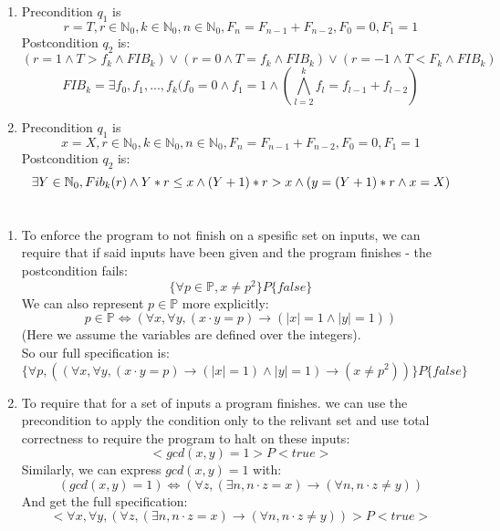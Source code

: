 \documentclass{article}
\begin{document}
\section{}
\begin{enumerate}[label=\Alph*.]
    \item Precondition $q_1$ is $$r=T, r \in \mathbb{N}_0, k \in \mathbb{N}_0, n \in \mathbb{N}_0, F_n = F_{n-1}+F_{n-2}, F_0 = 0, F_1 = 1$$
    Postcondition $q_2$ is: $$(r=1 \wedge T>f_k \wedge FIB_k) \vee (r=0 \wedge T=f_k \wedge FIB_k) \vee (r=-1 \wedge T<F_k \wedge FIB_k)$$
    $$FIB_k = \exists f_0, f_1,...,f_k(f_0=0 \wedge f_1=1 \wedge ( \bigwedge\limits_{l=2}^k f_l=f_{l-1} + f_{l-2} ) $$
    \item Precondition $q_1$ is $$x=X, r \in \mathbb{N}_0, k \in \mathbb{N}_0, n \in \mathbb{N}_0, F_n = F_{n-1}+F_{n-2}, F_0 = 0, F_1 = 1$$
    Postcondition $q_2$ is:
    $$ \exists Y \in \mathbb{N}_0, Fib_k(r) \wedge \\
    Y*r\leq x \wedge (Y+1)*r > x \wedge \\
    (y=(Y+1)*r \wedge x=X)$$
\end{enumerate}

\section{}
\begin{enumerate}[label=\Alph*.]
    \item To enforce the program to not finish
    on a spesific set on inputs, we can require that if
    said inputs have been given and the program finishes - 
    the postcondition fails:
    \[\{\forall p\in\mathbb{P}, x\neq p^2\}P\{false\}\]
    We can also represent $p\in\mathbb{P}$ more explicitly:
    \[p\in\mathbb{P}\Leftrightarrow
    (\forall x,\forall y, (x\cdot y=p)\rightarrow (|x|=1\wedge|y|=1))\]
    (Here we assume the variables are defined over the integers).\\
    So our full specification is:
    \[\{\forall p,
    ((\forall x,\forall y, (x\cdot y=p)\rightarrow (|x|=1)\wedge|y|=1)
    \rightarrow
    (x\neq p^2))\}P\{false\}\]
    \item To require that for a set of inputs a program finishes.
    we can use the precondition to apply the condition only to
    the relivant set and use total correctness to require the program to halt
    on these inputs:
    \[<gcd(x,y)=1>P<true>\]
    Similarly, we can express $gcd(x,y)=1$ with:
    \[
        (gcd(x,y)=1)
    \Leftrightarrow
        (\forall z,(\exists n, n\cdot z=x)\rightarrow (\forall n, n\cdot z\neq y))
    \]
    And get the full specification:
    \[<\forall x,\forall y,(\forall z,(\exists n, n\cdot z=x)\rightarrow (\forall n, n\cdot z\neq y))>P<true>\]
\end{enumerate}
\end{document}
